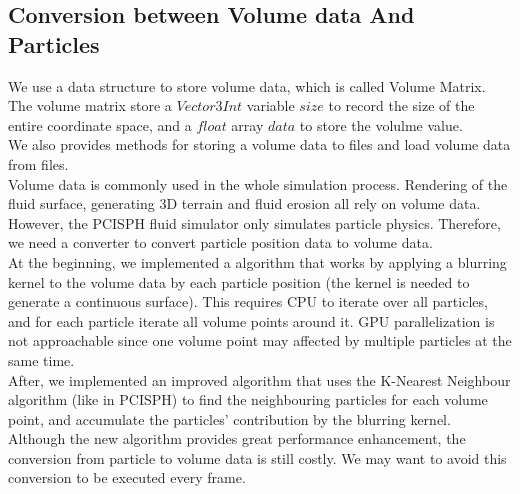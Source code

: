 \documentclass[acmtog]{acmart}
\begin{document}
\subsection{Conversion between Volume data And Particles}
We use a data structure to store volume data, which is called Volume Matrix.\\
The volume matrix store a $Vector3Int$ variable $size$ to record the size of the entire coordinate space, and a $float$ array $data$ to store the volulme value.\\
We also provides methods for storing a volume data to files and load volume data from files.\\
Volume data is commonly used in the whole simulation process. Rendering of the fluid surface, generating 3D terrain and fluid erosion all rely on volume data.\\
However, the PCISPH fluid simulator only simulates particle physics. Therefore, we need a converter to convert particle position data to volume data.\\
At the beginning, we implemented a algorithm that works by applying a blurring kernel to the volume data by each particle position (the kernel is needed to generate a continuous surface). This requires CPU to iterate over all particles, and for each particle iterate all volume points around it. GPU parallelization is not approachable since one volume point may affected by multiple particles at the same time.\\
After, we implemented an improved algorithm that uses the K-Nearest Neighbour algorithm (like in PCISPH) to find the neighbouring particles for each volume point, and accumulate the particles' contribution by the blurring kernel.\\
Although the new algorithm provides great performance enhancement, the conversion from particle to volume data is still costly. We may want to avoid this conversion to be executed every frame.
\end{document}
